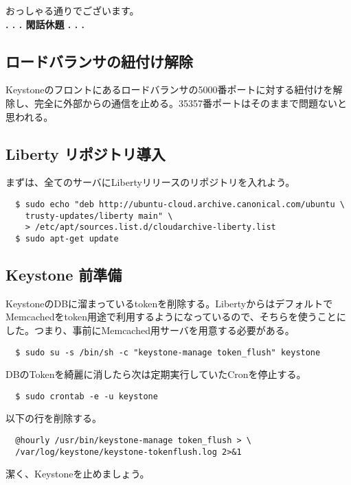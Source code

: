 \documentclass[9pt,b5paper,tombo,openany]{jsbook}
\begin{document}
\noindent
おっしゃる通りでございます。\\[1ex]

\noindent
\textbf{. . . 閑話休題 . . .}

\subsection{ロードバランサの紐付け解除}
Keystoneのフロントにあるロードバランサの5000番ポートに対する紐付けを解除し、完全に外部からの通信を止める。35357番ポートはそのままで問題ないと思われる。

\subsection{Liberty リポジトリ導入}
\noindent
まずは、全てのサーバにLibertyリリースのリポジトリを入れよう。

\begin{lstlisting}
  $ sudo echo "deb http://ubuntu-cloud.archive.canonical.com/ubuntu \
    trusty-updates/liberty main" \
    > /etc/apt/sources.list.d/cloudarchive-liberty.list
  $ sudo apt-get update
\end{lstlisting}

\subsection{Keystone 前準備}
KeystoneのDBに溜まっているtokenを削除する。LibertyからはデフォルトでMemcachedをtoken用途で利用するようになっているので、そちらを使うことにした。つまり、事前にMemcached用サーバを用意する必要がある。

\begin{lstlisting}
  $ sudo su -s /bin/sh -c "keystone-manage token_flush" keystone
\end{lstlisting}

\noindent
DBのTokenを綺麗に消したら次は定期実行していたCronを停止する。

\begin{lstlisting}
  $ sudo crontab -e -u keystone
\end{lstlisting}

\noindent
以下の行を削除する。

\begin{lstlisting}
  @hourly /usr/bin/keystone-manage token_flush > \
  /var/log/keystone/keystone-tokenflush.log 2>&1
\end{lstlisting}

\noindent
潔く、Keystoneを止めましょう。
\end{document}
